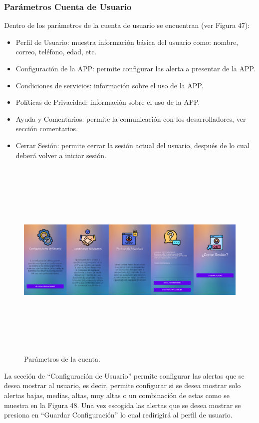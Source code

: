\documentclass[a4paper,10pt, oneside, titlepage]{article}
\begin{document}
	\subsubsection{Parámetros Cuenta de Usuario}
	Dentro de los parámetros de la cuenta de usuario se encuentran (ver Figura 47):
	\begin{itemize}
		\item Perfil de Usuario: muestra información básica del usuario como: nombre, correo, teléfono, edad, etc.
		\item Configuración de la APP: permite configurar las alerta a presentar de la APP.
		\item Condiciones de servicios: información sobre el uso de la APP.
		\item Políticas de Privacidad: información sobre el uso de la APP.
		\item Ayuda y Comentarios: permite la comunicación con los desarrolladores, ver sección comentarios.
		\item Cerrar Sesión: permite cerrar la sesión actual del usuario, después de lo cual deberá volver a iniciar sesión.
	\end{itemize}
	\begin{figure}[!ht]
		\centering
		\includegraphics[width = 1\linewidth, height = 9.8cm]{47.png}
		\caption{Parámetros de la cuenta.}
	\end{figure}
	La sección de ``Configuración de Usuario'' permite configurar las alertas que se desea mostrar al usuario, es decir, permite configurar si se desea mostrar solo alertas bajas, medias, altas, muy altas o un combinación de estas como se muestra en la Figura 48. Una vez escogida las alertas que se desea mostrar se presiona en ``Guardar Configuración'' lo cual redirigirá al perfil de usuario.
\end{document}
